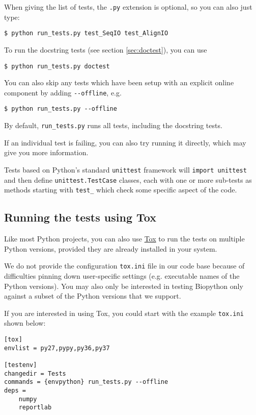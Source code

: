 When giving the list of tests, the \verb|.py| extension is optional,
so you can also just type:

\begin{verbatim}
$ python run_tests.py test_SeqIO test_AlignIO
\end{verbatim}

To run the docstring tests (see section \ref{sec:doctest}), you can use

\begin{verbatim}
$ python run_tests.py doctest
\end{verbatim}

You can also skip any tests which have been setup with an explicit
online component by adding \verb|--offline|, e.g.

\begin{verbatim}
$ python run_tests.py --offline
\end{verbatim}

By default, \verb|run_tests.py| runs all tests, including the docstring tests.

If an individual test is failing, you can also try running it
directly, which may give you more information.

Tests based on Python's standard  \verb|unittest| framework will
\verb|import unittest| and then define \verb|unittest.TestCase| classes,
each with one or more sub-tests as methods starting with \verb|test_| which
check some specific aspect of the code.

\subsection{Running the tests using Tox}

Like most Python projects, you can also use
\href{https://tox.readthedocs.org/en/latest/}{Tox} to run the tests on multiple
Python versions, provided they are already installed in your system.

We do not provide the configuration \texttt{tox.ini} file in our code base because
of difficulties pinning down user-specific settings (e.g. executable names of the
Python versions). You may also only be interested in testing Biopython only against
a subset of the Python versions that we support.

If you are interested in using Tox, you could start with the example
\texttt{tox.ini} shown below:

\begin{verbatim}
[tox]
envlist = py27,pypy,py36,py37

[testenv]
changedir = Tests
commands = {envpython} run_tests.py --offline
deps =
    numpy
    reportlab
\end{verbatim}

